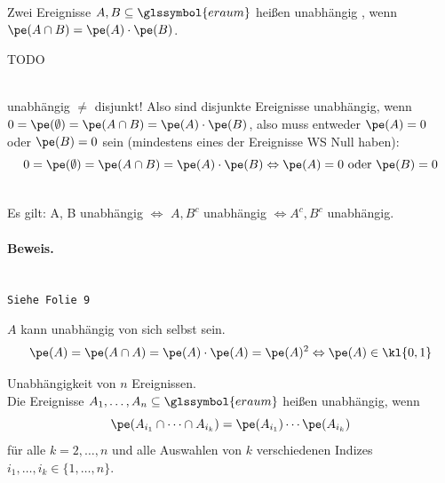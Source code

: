 \begin{defi}
    Zwei Ereignisse $A, B \subseteq \glssymbol{eraum} $ heißen unabhängig , wenn $\pe(A \cap B) = \pe(A) \cdot \pe(B)$.
\end{defi}
\begin{bsp}
TODO
\end{bsp}
\begin{beo}  \\
unabhängig $\neq$ disjunkt!
    \noindent Also sind disjunkte Ereignisse unabhängig, wenn $0 = \pe(\emptyset) = \pe(A \cap B) = \pe(A) \cdot \pe(B)$, also muss entweder $\pe(A)=0$ oder $\pe(B)=0$ sein (mindestens eines der Ereignisse WS Null haben):
    \[
        0 = \pe(\emptyset) = \pe(A \cap B) = \pe(A) \cdot \pe(B) \Leftrightarrow \pe(A)=0 \text{ oder } \pe(B)=0
    \]
\end{beo}
\begin{beo}  \\
Es gilt: A, B unabhängig $\Leftrightarrow$ $A, B^c$ unabhängig $\Leftrightarrow A^c, B^c$ unabhängig.

    \paragraph{Beweis.}  \\
    \texttt{Siehe Folie 9}
\end{beo}
\begin{beo}
    $A$ kann unabhängig von sich selbst sein. 
    \[
        \pe(A) = \pe(A \cap A) = \pe(A) \cdot \pe(A) = \pe(A)^2 \Leftrightarrow \pe(A) \in \kl{0,1}
    \]
\end{beo}
\begin{defi}
    Unabhängigkeit von $n$ Ereignissen.   \\
    Die Ereignisse $A_1 , \dots  , A_n \subseteq \glssymbol{eraum} $ heißen unabhängig, wenn
    \[
        \pe(A_{i_1} \cap \dots \cap A_{i_k}) = \pe(A_{i_1}) \cdots \pe(A_{i_k})
    \]
    für alle $k = 2, \dots  , n$ und alle Auswahlen von $k$ verschiedenen
    Indizes $i_1 , \dots  , i_k \in \{1, \dots  , n\}$. 
\end{defi}
